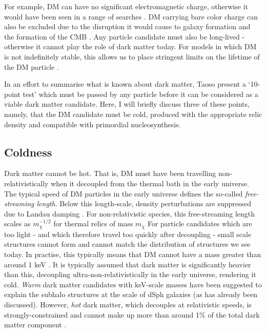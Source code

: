 For example, DM can have no significant electromagnetic charge, otherwise it would have been seen in a range of searches \cite{Kudo:2001,Perl:2001,Gninenko:2007,Melchiorri:2007}. DM carrying bare color charge can also be excluded due to the disruption it would cause to galaxy formation \cite{Natarajan:2002} and the formation of the CMB \cite{Chen:2002}. Any particle candidate must also be long-lived - otherwise it cannot play the role of dark matter today. For models in which DM is not indefinitely stable, this allows us to place stringent limits on the lifetime of the DM particle \cite{Amigo:2009,Bell:2010}. %

In an effort to summarise what is known about dark matter, Taoso \etal \cite{Taoso:2008} present a `10-point test' which must be passed by any particle before it can be considered as a viable dark matter candidate. Here, I will briefly discuss three of these points, namely, that the DM candidate must be cold, produced with the appropriate relic density and compatible with primordial nucleosynthesis.

\subsection{Coldness}

Dark matter cannot be hot. That is, DM must have been travelling non-relativistically when it decoupled from the thermal bath in the early universe. The typical speed of DM particles in the early universe defines the so-called \textit{free-streaming length}. Below this length-scale, density perturbations are suppressed due to Landau damping \cite{Bond:1983}. For non-relativistic species, this free-streaming length scales as $m_\chi^{-1/2}$ for thermal relics of mass $m_\chi$ \cite{Boyanovsky:2008} For particle candidates which are too light - and which therefore travel too quickly after decoupling - small scale structures cannot form and cannot match the distribution of structures we see today. In practise, this typically means that DM cannot have a mass greater than around 1 keV \cite{Narayanan:2000}. It is typically assumed that dark matter is significantly heavier than this, decoupling ultra-non-relativistically in the early universe, rendering it cold.  \textit{Warm} dark matter candidates with keV-scale masses have been suggested to explain the subhalo structures at the scale of dSph galaxies (as has already been discussed). However, \textit{hot} dark matter, which decouples at relativistic speeds, is strongly-constrained and cannot make up more than around 1\% of the total dark matter component \cite{Abazajian:2005, dePutter:2012}.


